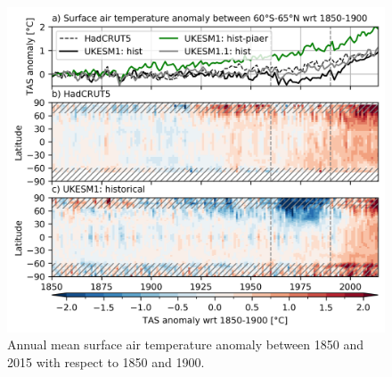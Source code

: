 \begin{figure}
    \centering
    \includegraphics{Appendix1/figs/TAS_anomaly_all.png}
    \caption{Annual mean surface air temperature anomaly between 1850 and 2015 with respect to 1850 and 1900.}
    \label{fig:app1:tas-anomaly-global}
\end{figure}

